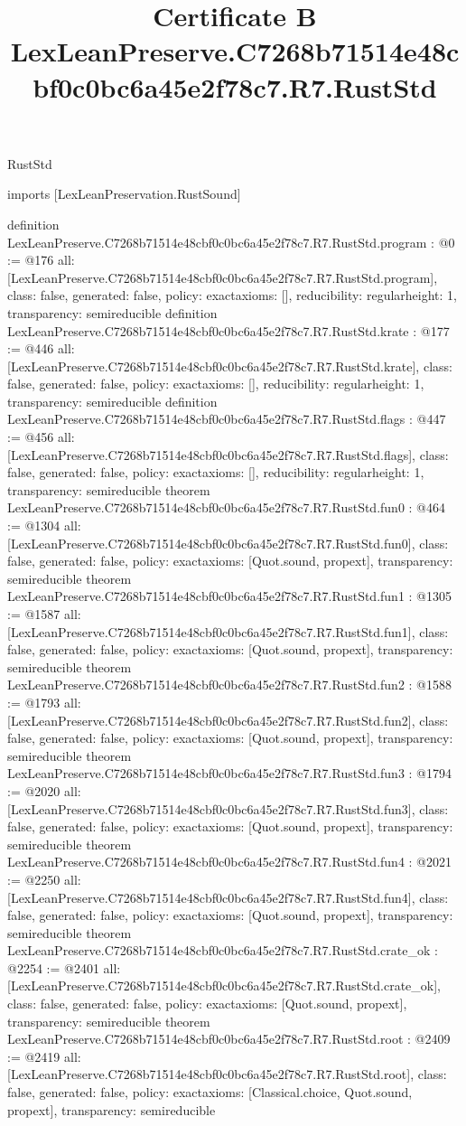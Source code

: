 \begin{lexlean}{RustStd}
\title{Certificate B LexLeanPreserve.C7268b71514e48cbf0c0bc6a45e2f78c7.R7.RustStd}
\begin{coremodule}
imports [LexLeanPreservation.RustSound]

definition LexLeanPreserve.C7268b71514e48cbf0c0bc6a45e2f78c7.R7.RustStd.program : @0 := @176 {
  all: [LexLeanPreserve.C7268b71514e48cbf0c0bc6a45e2f78c7.R7.RustStd.program],
  class: false,
  generated: false,
  policy: exact{axioms: []},
  reducibility: regular{height: 1},
  transparency: semireducible
}
definition LexLeanPreserve.C7268b71514e48cbf0c0bc6a45e2f78c7.R7.RustStd.krate : @177 := @446 {
  all: [LexLeanPreserve.C7268b71514e48cbf0c0bc6a45e2f78c7.R7.RustStd.krate],
  class: false,
  generated: false,
  policy: exact{axioms: []},
  reducibility: regular{height: 1},
  transparency: semireducible
}
definition LexLeanPreserve.C7268b71514e48cbf0c0bc6a45e2f78c7.R7.RustStd.flags : @447 := @456 {
  all: [LexLeanPreserve.C7268b71514e48cbf0c0bc6a45e2f78c7.R7.RustStd.flags],
  class: false,
  generated: false,
  policy: exact{axioms: []},
  reducibility: regular{height: 1},
  transparency: semireducible
}
theorem LexLeanPreserve.C7268b71514e48cbf0c0bc6a45e2f78c7.R7.RustStd.fun0 : @464 := @1304 {
  all: [LexLeanPreserve.C7268b71514e48cbf0c0bc6a45e2f78c7.R7.RustStd.fun0],
  class: false,
  generated: false,
  policy: exact{axioms: [Quot.sound, propext]},
  transparency: semireducible
}
theorem LexLeanPreserve.C7268b71514e48cbf0c0bc6a45e2f78c7.R7.RustStd.fun1 : @1305 := @1587 {
  all: [LexLeanPreserve.C7268b71514e48cbf0c0bc6a45e2f78c7.R7.RustStd.fun1],
  class: false,
  generated: false,
  policy: exact{axioms: [Quot.sound, propext]},
  transparency: semireducible
}
theorem LexLeanPreserve.C7268b71514e48cbf0c0bc6a45e2f78c7.R7.RustStd.fun2 : @1588 := @1793 {
  all: [LexLeanPreserve.C7268b71514e48cbf0c0bc6a45e2f78c7.R7.RustStd.fun2],
  class: false,
  generated: false,
  policy: exact{axioms: [Quot.sound, propext]},
  transparency: semireducible
}
theorem LexLeanPreserve.C7268b71514e48cbf0c0bc6a45e2f78c7.R7.RustStd.fun3 : @1794 := @2020 {
  all: [LexLeanPreserve.C7268b71514e48cbf0c0bc6a45e2f78c7.R7.RustStd.fun3],
  class: false,
  generated: false,
  policy: exact{axioms: [Quot.sound, propext]},
  transparency: semireducible
}
theorem LexLeanPreserve.C7268b71514e48cbf0c0bc6a45e2f78c7.R7.RustStd.fun4 : @2021 := @2250 {
  all: [LexLeanPreserve.C7268b71514e48cbf0c0bc6a45e2f78c7.R7.RustStd.fun4],
  class: false,
  generated: false,
  policy: exact{axioms: [Quot.sound, propext]},
  transparency: semireducible
}
theorem LexLeanPreserve.C7268b71514e48cbf0c0bc6a45e2f78c7.R7.RustStd.crate_ok : @2254 := @2401 {
  all: [LexLeanPreserve.C7268b71514e48cbf0c0bc6a45e2f78c7.R7.RustStd.crate_ok],
  class: false,
  generated: false,
  policy: exact{axioms: [Quot.sound, propext]},
  transparency: semireducible
}
theorem LexLeanPreserve.C7268b71514e48cbf0c0bc6a45e2f78c7.R7.RustStd.root : @2409 := @2419 {
  all: [LexLeanPreserve.C7268b71514e48cbf0c0bc6a45e2f78c7.R7.RustStd.root],
  class: false,
  generated: false,
  policy: exact{axioms: [Classical.choice, Quot.sound, propext]},
  transparency: semireducible
}


\end{coremodule}
\end{lexlean}
